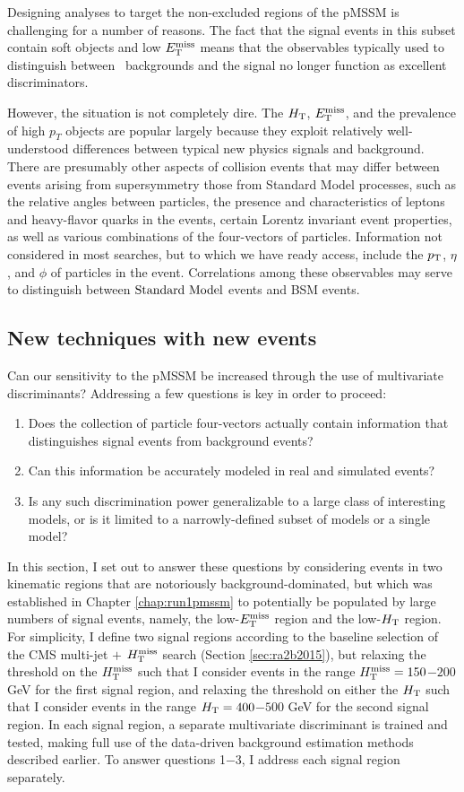 
Designing analyses to target the non-excluded regions of the pMSSM is challenging for a number of reasons. The fact that the signal events in this subset contain soft objects and low $E_{\text{T}}^{\rm miss}$ means that the observables typically used to distinguish between \SM~backgrounds and the signal no longer function as excellent discriminators. 

However, the situation is not completely dire. The  $H_{\rm T}$, $E_{\text{T}}^{\rm miss}$, and the prevalence of high $p_{T}$ objects are popular largely because they exploit relatively well-understood differences between typical new physics signals and background. There are presumably other aspects of collision events that may differ between events arising from supersymmetry those from Standard Model processes, such as the relative angles between particles, the presence and characteristics of leptons and heavy-flavor quarks in the events, certain Lorentz invariant event properties, as well as various combinations of the four-vectors of particles. Information not considered in most searches, but to which we have ready access, include the $p_{\text{T}}$, $\eta$, and $\phi$ of particles in the event. Correlations among these observables may serve to distinguish between $\text{Standard\ Model}$ events and BSM events. 

\subsection{New techniques with new events}
Can our sensitivity to the pMSSM be increased through the use of multivariate discriminants? Addressing a few questions is key in order to proceed: 
\begin{enumerate}
\item Does the collection of particle four-vectors actually contain information that distinguishes signal events from background events?
\item Can this information be accurately modeled in real and simulated events?
\item Is any such discrimination power generalizable to a large class of interesting models, or is it limited to a narrowly-defined subset of models or a single model?
\end{enumerate}
In this section, I set out to answer these questions by considering events in two kinematic regions that are notoriously background-dominated, but which was established in Chapter \ref{chap:run1pmssm} to potentially be populated by large numbers of signal events, namely, the low-$E_{\text{T}}^{\rm miss}$ region and the low-$H_{\rm T}$ region. For simplicity, I define two signal regions according to the baseline selection of the CMS multi-jet $+$ $H_{\text{T}}^{\rm miss}$ search (Section \ref{sec:ra2b2015}), but relaxing the threshold on the $H_{\text{T}}^{\rm miss}$  such that I consider events in the range $H_{\text{T}}^{\rm miss}=150$$-$$200$ GeV for the first signal region, and relaxing the threshold on either the $H_{\rm T}$  such that I consider events in the range $H_{\rm T}=400$$-$$500$ GeV for the second signal region. In each signal region, a separate multivariate discriminant is trained and tested, making full use of the data-driven background estimation methods described earlier. To answer questions 1$-$3, I address each signal region separately.

